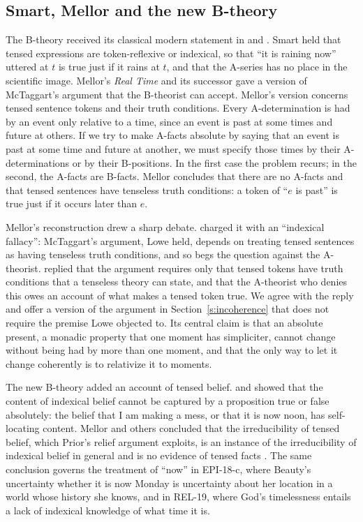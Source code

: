 \documentclass{situationist-preprint}
\begin{document}
\subsection{Smart, Mellor and the new B-theory}

The B-theory received its classical modern statement in \citet{Smart1963} and \citet{Mellor1981}. Smart held that tensed expressions are token-reflexive or indexical, so that \enquote{it is raining now} uttered at $t$ is true just if it rains at $t$, and that the A-series has no place in the scientific image. Mellor's \emph{Real Time} and its successor \citep{Mellor1998} gave a version of McTaggart's argument that the B-theorist can accept. Mellor's version concerns tensed sentence tokens and their truth conditions. Every A-determination is had by an event only relative to a time, since an event is past at some times and future at others. If we try to make A-facts absolute by saying that an event is past at some time and future at another, we must specify those times by their A-determinations or by their B-positions. In the first case the problem recurs; in the second, the A-facts are B-facts. Mellor concludes that there are no A-facts and that tensed sentences have tenseless truth conditions: a token of \enquote{$e$ is past} is true just if it occurs later than $e$.

Mellor's reconstruction drew a sharp debate. \citet{Lowe1987} charged it with an \enquote{indexical fallacy}: McTaggart's argument, Lowe held, depends on treating tensed sentences as having tenseless truth conditions, and so begs the question against the A-theorist. \citet{LePoidevinMellor1987} replied that the argument requires only that tensed tokens have truth conditions that a tenseless theory can state, and that the A-theorist who denies this owes an account of what makes a tensed token true. We agree with the reply and offer a version of the argument in Section~\ref{s:incoherence} that does not require the premise Lowe objected to. Its central claim is that an absolute present, a monadic property that one moment has simpliciter, cannot change without being had by more than one moment, and that the only way to let it change coherently is to relativize it to moments.

The new B-theory added an account of tensed belief. \citet{Perry1979} and \citet{Lewis1979} showed that the content of indexical belief cannot be captured by a proposition true or false absolutely: the belief that I am making a mess, or that it is now noon, has self-locating content. Mellor and others concluded that the irreducibility of tensed belief, which Prior's relief argument exploits, is an instance of the irreducibility of indexical belief in general and is no evidence of tensed facts \citep{Mellor1998}. The same conclusion governs the treatment of \enquote{now} in EPI-18-c, where Beauty's uncertainty whether it is now Monday is uncertainty about her location in a world whose history she knows, and in REL-19, where God's timelessness entails a lack of indexical knowledge of what time it is.
\end{document}

